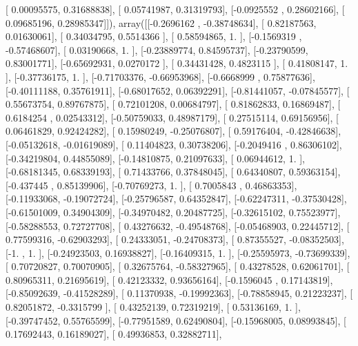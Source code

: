 \documentclass{article}
\begin{document}
       [ 0.00095575,  0.31688838],
       [ 0.05741987,  0.31319793],
       [-0.0925552 ,  0.28602166],
       [ 0.09685196,  0.28985347]]), array([[-0.2696162 , -0.38748634],
       [ 0.82187563,  0.01630061],
       [ 0.34034795,  0.5514366 ],
       [ 0.58594865,  1.        ],
       [-0.1569319 , -0.57468607],
       [ 0.03190668,  1.        ],
       [-0.23889774,  0.84595737],
       [-0.23790599,  0.83001771],
       [-0.65692931,  0.0270172 ],
       [ 0.34431428,  0.4823115 ],
       [ 0.41808147,  1.        ],
       [-0.37736175,  1.        ],
       [-0.71703376, -0.66953968],
       [-0.6668999 ,  0.75877636],
       [-0.40111188,  0.35761911],
       [-0.68017652,  0.06392291],
       [-0.81441057, -0.07845577],
       [ 0.55673754,  0.89767875],
       [ 0.72101208,  0.00684797],
       [ 0.81862833,  0.16869487],
       [ 0.6184254 ,  0.02543312],
       [-0.50759033,  0.48987179],
       [ 0.27515114,  0.69156956],
       [ 0.06461829,  0.92424282],
       [ 0.15980249, -0.25076807],
       [ 0.59176404, -0.42846638],
       [-0.05132618, -0.01619089],
       [ 0.11404823,  0.30738206],
       [-0.2049416 ,  0.86306102],
       [-0.34219804,  0.44855089],
       [-0.14810875,  0.21097633],
       [ 0.06944612,  1.        ],
       [-0.68181345,  0.68339193],
       [ 0.71433766,  0.37848045],
       [ 0.64340807,  0.59363154],
       [-0.437445  ,  0.85139906],
       [-0.70769273,  1.        ],
       [ 0.7005843 ,  0.46863353],
       [-0.11933068, -0.19072724],
       [-0.25796587,  0.64352847],
       [-0.62247311, -0.37530428],
       [-0.61501009,  0.34904309],
       [-0.34970482,  0.20487725],
       [-0.32615102,  0.75523977],
       [-0.58288553,  0.72727708],
       [ 0.43276632, -0.49548768],
       [-0.05468903,  0.22445712],
       [ 0.77599316, -0.62903293],
       [ 0.24333051, -0.24708373],
       [ 0.87355527, -0.08352503],
       [-1.        ,  1.        ],
       [-0.24923503,  0.16938827],
       [-0.16409315,  1.        ],
       [-0.25595973, -0.73699339],
       [ 0.70720827,  0.70070905],
       [ 0.32675764, -0.58327965],
       [ 0.43278528,  0.62061701],
       [ 0.80965311,  0.21695619],
       [ 0.42123332,  0.93656164],
       [-0.1596045 ,  0.17143819],
       [-0.85092639, -0.41528289],
       [ 0.11370938, -0.19992363],
       [-0.78858945,  0.21223237],
       [ 0.82051872, -0.3315799 ],
       [ 0.43252139,  0.72319219],
       [ 0.53136169,  1.        ],
       [-0.39747452,  0.55765599],
       [-0.77951589,  0.62490804],
       [-0.15968005,  0.08993845],
       [ 0.17692443,  0.16189027],
       [ 0.49936853,  0.32882711],
\end{document}
